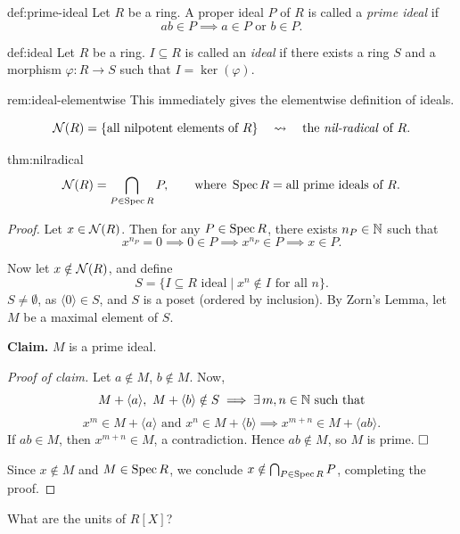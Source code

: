 \begin{definition}{}{def:prime-ideal}
Let $R$ be a ring. A proper ideal $P$ of $R$ is called a \emph{prime ideal} if
\[
ab \in P \implies a \in P \text{ or } b \in P.
\]
\end{definition}

\begin{definition}{}{def:ideal}
Let $R$ be a ring. $I \subseteq R$ is called an \emph{ideal} if there exists a ring $S$ and a morphism $\varphi: R \to S$ such that $I = \ker(\varphi)$.
\end{definition}

\begin{remark}{}{rem:ideal-elementwise}
This immediately gives the elementwise definition of ideals.
\end{remark}

\[
\mathcal{N}(R) = \{\text{all nilpotent elements of } R\} \quad \leadsto \quad \text{the \emph{nil-radical} of } R.
\]

\begin{theorem}{}{thm:nilradical}
\[
\mathcal{N}(R) = \bigcap_{P \in \operatorname{Spec} R} P, \qquad \text{where } \operatorname{Spec} R = \text{all prime ideals of } R.
\]
\end{theorem}

\begin{proof}
Let $x \in \mathcal{N}(R)$. Then for any $P \in \operatorname{Spec} R$, there exists $n_P \in \mathbb{N}$ such that
\[
x^{n_P} = 0 \implies 0 \in P \implies x^{n_P} \in P \implies x \in P.
\]

Now let $x \notin \mathcal{N}(R)$, and define
\[
S = \{ I \subseteq R \text{ ideal} \mid x^n \notin I \text{ for all } n \}.
\]
$S \neq \emptyset$, as $\langle 0 \rangle \in S$, and $S$ is a poset (ordered by inclusion). By Zorn's Lemma, let $M$ be a maximal element of $S$.

\textbf{Claim.} $M$ is a prime ideal.

\emph{Proof of claim.} Let $a \notin M$, $b \notin M$. Now,
\[
M + \langle a \rangle, \ M + \langle b \rangle \notin S \implies \exists\, m, n \in \mathbb{N} \text{ such that}
\]
\[
x^m \in M + \langle a \rangle \text{ and } x^n \in M + \langle b \rangle \implies x^{m+n} \in M + \langle ab \rangle.
\]
If $ab \in M$, then $x^{m+n} \in M$, a contradiction. Hence $ab \notin M$, so $M$ is prime. $\hfill\square$

Since $x \notin M$ and $M \in \operatorname{Spec} R$, we conclude $x \notin \bigcap_{P \in \operatorname{Spec} R} P$, completing the proof.
\end{proof}

\begin{question}
What are the units of $R[X]$?
\end{question}

